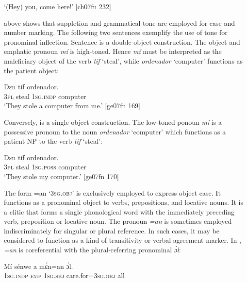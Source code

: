 \glt ‘(Hey) you, come here!’ [ch07fn 232]
\z

 above shows that suppletion and grammatical tone are employed for case and number marking. The following two sentences exemplify the use of tone for pronominal inflection. Sentence  is a double-object construction. The object and emphatic pronoun \textit{mí} is high-toned. Hence \textit{mí} must be interpreted as the maleficiary object of the verb \textit{tíf} ‘steal’, while \textit{ordenador} ‘computer’ functions as the patient object:


\ea%
    \label{ex:key:284}
    \gll Dɛn  tíf        ordenador.\\
\textsc{3pl}  steal  \textsc{1sg.indp}  computer\\

\glt ‘They stole a computer from me.’ [ge07fn 169]
\z

Conversely,  is a single object construction. The low-toned ponoun \textit{mi} is a possessive pronoun to the noun \textit{ordenador} ‘computer’ which functions as a patient \textsc{NP} to the verb \textit{tíf} ‘steal’:


\ea%
    \label{ex:key:285}
    \gll Dɛn  tíf        ordenador.\\
\textsc{3pl}  steal  \textsc{1sg.poss}  computer\\

\glt ‘They stole my computer.’ [ge07fn 170]
\z

The form =an ‘\textsc{3sg.obj}’ is exclusively employed to express object case. It functions as a pronominal object to verbs, prepositions, and locative nouns. It is a clitic that forms a single phonological word with the immediately preceding verb, preposition or locative noun. The pronoun \textit{=an} is sometimes employed indiscriminately for singular or plural reference. In such cases, it may be considered to function as a kind of transitivity or verbal agreement marker. In , \textit{=an} is coreferential with the plural-referring pronominal \textit{ɔ́l}: 


\ea%
    \label{ex:key:286}
    \gll Mí    sénwe  a    mɛ́n=an      ɔ́l.\\
\textsc{1sg.indp}  \textsc{emp}    \textsc{1sg.sbj}  care.for=\textsc{3sg.obj}  all\\

